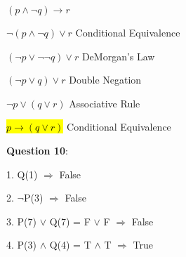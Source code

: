\documentclass{article} %
\newcommand{\question}[2][]{\begin{flushleft}
        \textbf{Question #1}: \textit{#2}

\end{flushleft}}
\begin{document}
        $(p \land \neg q) \rightarrow r$

        $\neg(p \land \neg q) \lor r$ \tabto*{3.5cm} Conditional Equivalence

        $(\neg p \lor \neg \neg q) \lor r$ \tabto*{3.5cm} DeMorgan's Law

        $(\neg p \lor q) \lor r$ \tabto*{3.5cm} Double Negation

        $\neg p \lor (q \lor r)$ \tabto*{3.5cm} Associative Rule

        \hl{$p \rightarrow (q \lor r)$} \tabto*{3.5cm} Conditional Equivalence

    \question[10]{}

        1. Q(1) $\Rightarrow$ False

        2. $\neg$P(3) $\Rightarrow$ False

        3. P(7) $\lor$ Q(7) = F $\lor$ F $\Rightarrow$ False

        4. P(3) $\land$ Q(4) = T $\land$ T $\Rightarrow$ True
\end{document}
